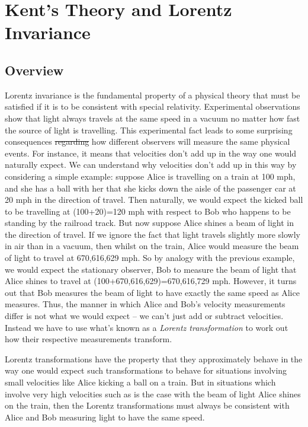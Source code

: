 \documentclass[12pt]{report}
\providecommand{\DIFadd}[1]{{\protect\color{blue}\uwave{#1}}} %
\providecommand{\DIFdel}[1]{{\protect\color{red}\sout{#1}}}                      %
\providecommand{\DIFaddbegin}{} %
\providecommand{\DIFaddend}{} %
\providecommand{\DIFdelbegin}{} %
\providecommand{\DIFdelend}{} %
\begin{document}


\section{Kent's Theory and Lorentz Invariance\label{LorentzInvariance}}
\subsection{Overview}
Lorentz invariance is the fundamental property of a physical theory that must be satisfied if it is to be consistent with special relativity. Experimental observations show that light always travels at the same speed in a vacuum no matter how fast the source of light is travelling. This experimental fact leads to some surprising consequences \DIFdelbegin \DIFdel{regarding }\DIFdelend \DIFaddbegin \DIFadd{for }\DIFaddend how different observers will measure the same physical events. For instance, it means that velocities don't add up in the way one would naturally expect. We can understand why velocities don't add up in this way by considering a simple example: suppose Alice is travelling on a train at 100 mph, and she has a ball with her that she kicks down the aisle of the passenger car at 20 mph in the direction of travel. Then naturally, we would expect the kicked ball to be travelling at (100+20)=120 mph with respect to Bob who happens to be standing by the railroad track.  But now suppose Alice shines a beam of light in the direction of travel. If we ignore the fact that light travels slightly more slowly in air than in a vacuum, then whilst on the train, Alice would measure the beam of light to travel at 670,616,629 mph. So by analogy with the previous example, we would expect the stationary observer, Bob to measure the beam of light that Alice shines to travel at (100+670,616,629)=670,616,729 mph. However, it turns out that Bob measures the beam of light to have exactly the same speed as Alice measures. Thus, the manner in which Alice and Bob's velocity measurements differ is not what we would expect -- we can't just add or subtract velocities. Instead we have to use what's known as a \emph{Lorentz transformation} to work out how their respective measurements transform.  

Lorentz transformations have the property that they approximately behave in the way one would expect such transformations to behave for situations involving small velocities like Alice kicking a ball on a train. But in situations which involve very high velocities such as is the case with the beam of light Alice shines on the train, then the Lorentz transformations must always be consistent with Alice and Bob measuring light to have the same speed. 
\end{document}

